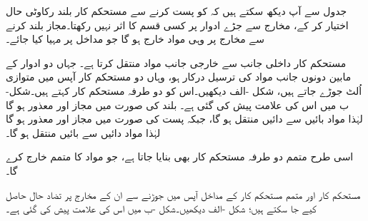 جدول سے آپ دیکھ سکتے ہیں کہ  کو پست  کرنے سے مستحکم کار بلند رکاوٹی حال اختیار کر کے، مخارج سے جڑے ادوار پر کسی قسم کا اثر نہیں رکھتا۔مجاز بلند  کرنے سے مخارج پر وہی مواد خارج ہو گا جو مداخل پر مہیا کیا جائے۔


مستحکم کار داخلی جانب سے خارجی جانب مواد منتقل کرتا ہے۔ جہاں دو ادوار کے مابین دونوں جانب مواد کی ترسیل درکار ہو، وہاں دو مستحکم کار آپس میں متوازی اُلٹ جوڑے جاتے ہیں، شکل -الف دیکھیں۔اس کو دو طرفہ مستحکم کار کہتے ہیں۔شکل-ب میں اس کی علامت پیش کی گئی ہے۔ بلند  کی صورت میں  مجاز اور  معذور ہو گا لہٰذا مواد بائیں سے دائیں منتقل ہو گا، جبکہ پست  کی صورت میں  مجاز اور  معذور ہو گا لہٰذا مواد دائیں سے بائیں منتقل ہو گا۔

اسی طرح متمم دو طرفہ مستحکم کار بھی بنایا جاتا ہے، جو مواد کا متمم خارج کرے گا۔

 مستحکم کار اور متمم مستحکم کار کے مداخل آپس میں جوڑنے سے ان کے مخارج پر تضاد حال حاصل کیے جا سکتے ہیں؛ شکل -الف دیکھیں۔شکل -ب میں اس کی علامت پیش کی گئی ہے۔
 
